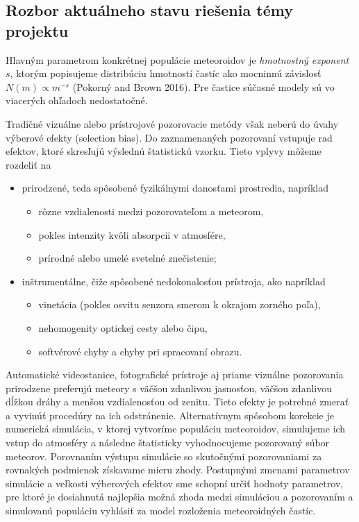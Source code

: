 \subsection{Rozbor aktuálneho stavu riešenia témy
projektu}\label{rozbor-aktuuxe1lneho-stavu-rieux161enia-tuxe9my-projektu}

Hlavným parametrom konkrétnej populácie meteoroidov je \emph{hmotnostný
exponent} \(s\), ktorým popisujeme distribúciu hmotností častíc ako
mocninnú závislosť \(N(m) \propto m^{-s}\) (Pokorný and Brown 2016). Pre
častice súčasné modely sú vo viacerých ohľadoch nedostatočné.

Tradičné vizuálne alebo prístrojové pozorovacie metódy však neberú do
úvahy výberové efekty (selection bias). Do zaznamenaných pozorovaní
vstupuje rad efektov, ktoré skresľujú výslednú štatistickú vzorku. Tieto
vplyvy môžeme rozdeliť na

\begin{itemize}
\tightlist
\item
  prirodzené, teda spôsobené fyzikálnymi danosťami prostredia, napríklad

  \begin{itemize}
  \tightlist
  \item
    rôzne vzdialenosti medzi pozorovateľom a meteorom,
  \item
    pokles intenzity kvôli absorpcii v atmosfére,
  \item
    prírodné alebo umelé svetelné znečistenie;
  \end{itemize}
\item
  inštrumentálne, čiže spôsobené nedokonalosťou prístroja, ako napríklad

  \begin{itemize}
  \tightlist
  \item
    vinetácia (pokles osvitu senzora smerom k okrajom zorného poľa),
  \item
    nehomogenity optickej cesty alebo čipu,
  \item
    softvérové chyby a chyby pri spracovaní obrazu.
  \end{itemize}
\end{itemize}

Automatické videostanice, fotografické prístroje aj priame vizuálne
pozorovania prirodzene preferujú meteory s väčšou zdanlivou jasnosťou,
väčšou zdanlivou dĺžkou dráhy a menšou vzdialenosťou od zenitu. Tieto
efekty je potrebné zmerať a vyvinúť procedúry na ich odstránenie.
Alternatívnym spôsobom korekcie je numerická simulácia, v ktorej
vytvoríme populáciu meteoroidov, simulujeme ich vstup do atmosféry a
následne štatisticky vyhodnocujeme pozorovaný súbor meteorov. Porovnaním
výstupu simulácie so skutočnými pozorovaniami za rovnakých podmienok
získavame mieru zhody. Postupnými zmenami parametrov simulácie a
veľkosti výberových efektov sme schopní určiť hodnoty parametrov, pre
ktoré je dosiahnutá najlepšia možná zhoda medzi simuláciou a pozorovaním
a simulovanú populáciu vyhlásiť za model rozloženia meteoroidných
častíc.

